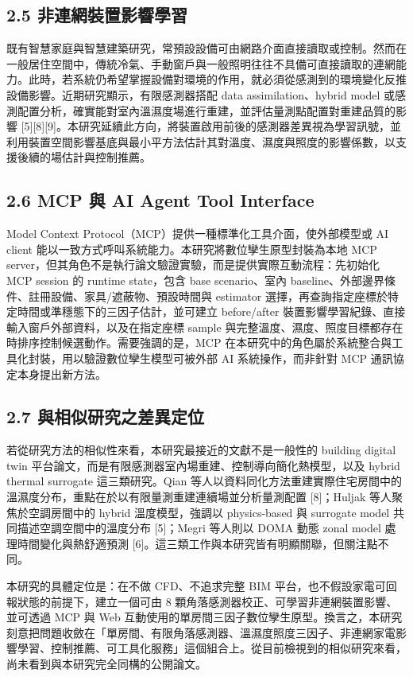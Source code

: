 \documentclass[12pt,a4paper]{article}
\begin{document}
\subsection*{2.5 非連網裝置影響學習}

既有智慧家庭與智慧建築研究，常預設設備可由網路介面直接讀取或控制。然而在一般居住空間中，傳統冷氣、手動窗戶與一般照明往往不具備可直接讀取的連網能力。此時，若系統仍希望掌握設備對環境的作用，就必須從感測到的環境變化反推設備影響。近期研究顯示，有限感測器搭配 data assimilation、hybrid model 或感測配置分析，確實能對室內溫濕度場進行重建，並評估量測點配置對重建品質的影響 [5][8][9]。本研究延續此方向，將裝置啟用前後的感測器差異視為學習訊號，並利用裝置空間影響基底與最小平方法估計其對溫度、濕度與照度的影響係數，以支援後續的場估計與控制推薦。


\subsection*{2.6 MCP 與 AI Agent Tool Interface}

Model Context Protocol（MCP）提供一種標準化工具介面，使外部模型或 AI client 能以一致方式呼叫系統能力。本研究將數位孿生原型封裝為本地 MCP server，但其角色不是執行論文驗證實驗，而是提供實際互動流程：先初始化 MCP session 的 runtime state，包含 base scenario、室內 baseline、外部邊界條件、註冊設備、家具/遮蔽物、預設時間與 estimator 選擇，再查詢指定座標於特定時間或準穩態下的三因子估計，並可建立 before/after 裝置影響學習紀錄、直接輸入窗戶外部資料，以及在指定座標 sample 與完整溫度、濕度、照度目標都存在時排序控制候選動作。需要強調的是，MCP 在本研究中的角色屬於系統整合與工具化封裝，用以驗證數位孿生模型可被外部 AI 系統操作，而非針對 MCP 通訊協定本身提出新方法。


\subsection*{2.7 與相似研究之差異定位}

若從研究方法的相似性來看，本研究最接近的文獻不是一般性的 building digital twin 平台論文，而是有限感測器室內場重建、控制導向簡化熱模型，以及 hybrid thermal surrogate 這三類研究。Qian 等人以資料同化方法重建實際住宅房間中的溫濕度分布，重點在於以有限量測重建連續場並分析量測配置 [8]；Huljak 等人聚焦於空調房間中的 hybrid 溫度模型，強調以 physics-based 與 surrogate model 共同描述空調空間中的溫度分布 [5]；Megri 等人則以 DOMA 動態 zonal model 處理時間變化與熱舒適預測 [6]。這三類工作與本研究皆有明顯關聯，但關注點不同。


本研究的具體定位是：在不做 CFD、不追求完整 BIM 平台，也不假設家電可回報狀態的前提下，建立一個可由 8 顆角落感測器校正、可學習非連網裝置影響、並可透過 MCP 與 Web 互動使用的單房間三因子數位孿生原型。換言之，本研究刻意把問題收斂在「單房間、有限角落感測器、溫濕度照度三因子、非連網家電影響學習、控制推薦、可工具化服務」這個組合上。從目前檢視到的相似研究來看，尚未看到與本研究完全同構的公開論文。
\end{document}

